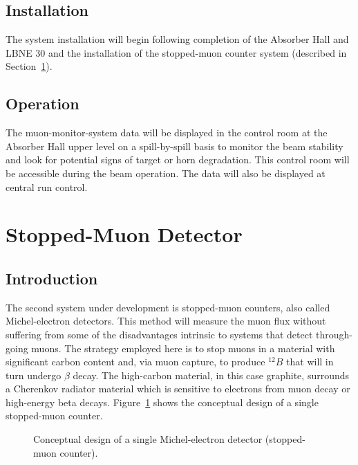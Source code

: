 \subsection{Installation}

The system installation will begin following completion of the
Absorber Hall and LBNE 30
and the installation of the stopped-muon counter system
(described in Section~\ref{v3ch3-stop-mu-det}).

\subsection{Operation}

The muon-monitor-system data will be displayed in the control room 
at the Absorber Hall upper level on
a spill-by-spill basis to monitor the beam stability and look for potential signs of target or horn degradation. 
This control room will be accessible during the beam operation.
The data will also be displayed at central run control.  

%
%
\section{Stopped-Muon Detector} %
\label{v3ch3-stop-mu-det}
\subsection{Introduction}

The second system under development is stopped-muon counters, also called
Michel-electron detectors. This method will measure the muon flux without
suffering from some of the disadvantages intrinsic to systems that
detect through-going muons. The strategy employed here is to stop muons
in a material with significant carbon content 
and, via muon capture, to produce $^{12}B$ that will in turn undergo $\beta$ decay.
 The high-carbon material, in this case graphite, surrounds a Cherenkov radiator
material which is sensitive to electrons from muon decay or 
high-energy beta decays.  Figure~\ref{fig:MichelDecayOptions} shows the conceptual design 
of a 
single stopped-muon counter. 


\begin{figure}[htbp]
\begin{center}
\caption[Michel-electron detector conceptualization]{Conceptual design of a single Michel-electron detector (stopped-muon counter). 
}
\label{fig:MichelDecayOptions}
\end{center}
\end{figure}

